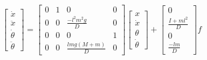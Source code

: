 \documentclass{article}
\begin{document}
\thispagestyle{empty}

$$
\begin{bmatrix}\dot{x}\\\ddot{x}\\\dot{\theta}\\\ddot{\theta}\end{bmatrix} = 
\begin{bmatrix}
0 & 1 & 0 & 0\\
0 & 0 & \frac{-l^2m^2g}{D} & 0 \\ 
0 & 0 & 0 & 1\\
0 & 0 & \frac{lmg(M+m)}{D} & 0
\end{bmatrix}
\begin{bmatrix}{x}\\\dot{x}\\{\theta}\\\dot{\theta}\end{bmatrix}  +
\begin{bmatrix} 0 \\ \frac{I+ml^2}{D} \\ 0 \\ \frac{-lm}{D} \end{bmatrix} f
$$
\end{document}
